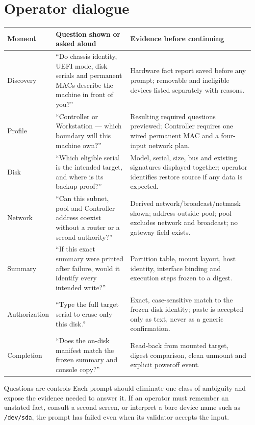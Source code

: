 \section{Operator dialogue}
\begin{tabularx}{\linewidth}{@{}p{.19\linewidth}p{.36\linewidth}L@{}}
\toprule
\textbf{Moment} & \textbf{Question shown or asked aloud} & \textbf{Evidence before continuing}\\
\midrule
Discovery & ``Do chassis identity, UEFI mode, disk serials and permanent MACs describe the machine in front of you?'' & Hardware fact report saved before any prompt; removable and ineligible devices listed separately with reasons.\\
Profile & ``Controller or Workstation --- which boundary will this machine own?'' & Resulting required questions previewed; Controller requires one wired permanent MAC and a four-input network plan.\\
Disk & ``Which eligible serial is the intended target, and where is its backup proof?'' & Model, serial, size, bus and existing signatures displayed together; operator identifies restore source if any data is expected.\\
Network & ``Can this subnet, pool and Controller address coexist without a router or a second authority?'' & Derived network/broadcast/netmask shown; address outside pool; pool excludes network and broadcast; no gateway field exists.\\
Summary & ``If this exact summary were printed after failure, would it identify every intended write?'' & Partition table, mount layout, host identity, interface binding and execution steps frozen to a digest.\\
Authorization & ``Type the full target serial to erase only this disk.'' & Exact, case-sensitive match to the frozen disk identity; paste is accepted only as text, never as a generic confirmation.\\
Completion & ``Does the on-disk manifest match the frozen summary and console copy?'' & Read-back from mounted target, digest comparison, clean unmount and explicit poweroff event.\\
\bottomrule
\end{tabularx}

\begin{telospanel}{Questions are controls}
Each prompt should eliminate one class of ambiguity and expose the evidence
needed to answer it. If an operator must remember an unstated fact, consult a
second screen, or interpret a bare device name such as \texttt{/dev/sda}, the
prompt has failed even when its validator accepts the input.
\end{telospanel}

